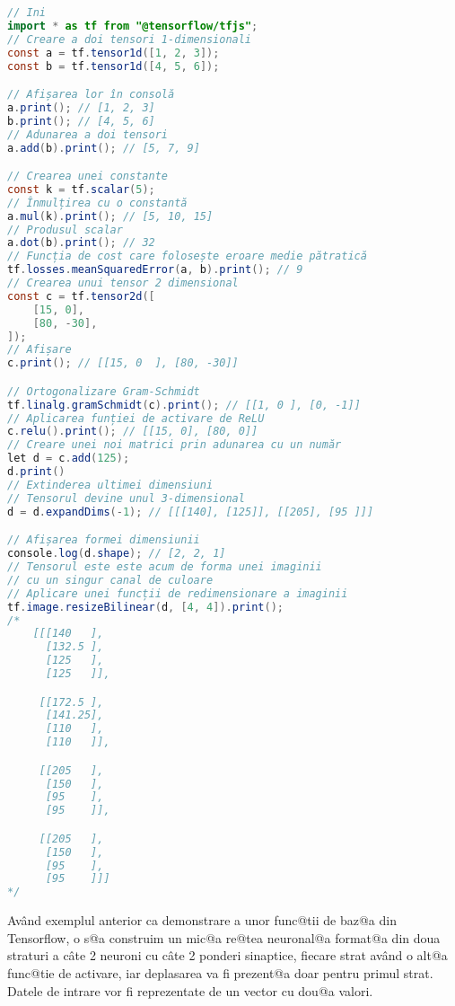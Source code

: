 \begin{lstlisting}[language=Java, caption=Exemplul 1 de folosire a bibliotecii Tensorflow., label={lst:exemple-tensor}]
// Ini	
import * as tf from "@tensorflow/tfjs";
// Creare a doi tensori 1-dimensionali
const a = tf.tensor1d([1, 2, 3]);
const b = tf.tensor1d([4, 5, 6]);

// Afișarea lor în consolă
a.print(); // [1, 2, 3]
b.print(); // [4, 5, 6]
// Adunarea a doi tensori
a.add(b).print(); // [5, 7, 9]

// Crearea unei constante
const k = tf.scalar(5);
// Înmulțirea cu o constantă
a.mul(k).print(); // [5, 10, 15]
// Produsul scalar
a.dot(b).print(); // 32
// Funcția de cost care folosește eroare medie pătratică
tf.losses.meanSquaredError(a, b).print(); // 9
// Crearea unui tensor 2 dimensional
const c = tf.tensor2d([
    [15, 0],
    [80, -30],
]);
// Afișare
c.print(); // [[15, 0  ], [80, -30]]

// Ortogonalizare Gram-Schmidt
tf.linalg.gramSchmidt(c).print(); // [[1, 0 ], [0, -1]]
// Aplicarea funției de activare de ReLU
c.relu().print(); // [[15, 0], [80, 0]]
// Creare unei noi matrici prin adunarea cu un număr
let d = c.add(125);
d.print()
// Extinderea ultimei dimensiuni
// Tensorul devine unul 3-dimensional
d = d.expandDims(-1); // [[[140], [125]], [[205], [95 ]]]

// Afișarea formei dimensiunii
console.log(d.shape); // [2, 2, 1]
// Tensorul este este acum de forma unei imaginii
// cu un singur canal de culoare
// Aplicare unei funcții de redimensionare a imaginii
tf.image.resizeBilinear(d, [4, 4]).print();
/*
    [[[140   ],
      [132.5 ],
      [125   ],
      [125   ]],

     [[172.5 ],
      [141.25],
      [110   ],
      [110   ]],

     [[205   ],
      [150   ],
      [95    ],
      [95    ]],

     [[205   ],
      [150   ],
      [95    ],
      [95    ]]]
*/	
\end{lstlisting}

Av\^ and exemplul anterior ca demonstrare a unor func@tii de baz@a din Tensorflow, o s@a construim un mic@a re@tea neuronal@a format@a din doua straturi a c\^ ate 2 neuroni cu c\^ ate 2 ponderi sinaptice, fiecare strat av\^ and o alt@a func@tie de activare, iar deplasarea va fi prezent@a doar pentru primul strat. Datele de intrare vor fi reprezentate de un vector cu dou@a valori.


